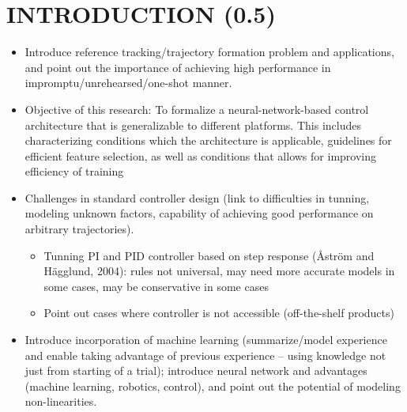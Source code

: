 \section{INTRODUCTION (0.5)}
\begin{itemize}
\item Introduce reference tracking/trajectory formation problem and applications, and point out the importance of achieving high performance in impromptu/unrehearsed/one-shot manner.
\item Objective of this research: To formalize a neural-network-based control architecture that is generalizable to different platforms. This includes characterizing conditions which the architecture is applicable, guidelines for efficient feature selection, as well as conditions that allows for improving efficiency of training
\item Challenges in standard controller design (link to difficulties in tunning, modeling unknown factors, capability of achieving good performance on arbitrary trajectories).
\begin{itemize}
\item Tunning PI and PID controller based on step response (\r{A}str\"{o}m and H\"{a}gglund, 2004): rules not universal, may need more accurate models in some cases, may be conservative in some cases
\item Point out cases where controller is not accessible (off-the-shelf products)
\end{itemize}
\item Introduce incorporation of machine learning (summarize/model experience and enable taking advantage of previous experience -- using knowledge not just from starting of a trial); introduce neural network and advantages (machine learning, robotics, control), and point out the potential of modeling non-linearities.

\end{itemize}
